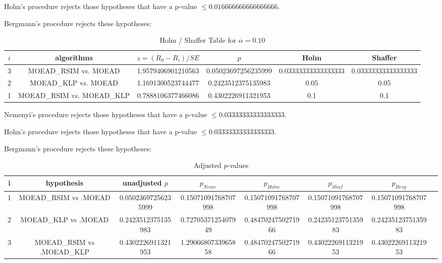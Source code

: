 \documentclass[a4paper,10pt]{article}
\begin{document}
\begin{landscape}
Holm's procedure rejects those hypotheses that have a p-value $\le0.016666666666666666$.


Bergmann's procedure rejects these hypotheses:


\begin{itemize}


\end{itemize}


\begin{table}[!htp]
\centering\tiny
\caption{Holm / Shaffer Table for $\alpha=0.10$}
\begin{tabular}{cccccc}
$i$&algorithms&$z=(R_0 - R_i)/SE$&$p$&Holm&Shaffer\\
\hline
3&MOEAD_RSIM vs. MOEAD&1.9579406901210563&0.05023697256235999&0.03333333333333333&0.03333333333333333\\
2&MOEAD_KLP vs. MOEAD&1.1691300523744477&0.2423512375135983&0.05&0.05\\
1&MOEAD_RSIM vs. MOEAD_KLP&0.7888106377466086&0.4302226911321953&0.1&0.1\\
\hline
\end{tabular}
\end{table}
Nemenyi's procedure rejects those hypotheses that have a p-value $\le0.03333333333333333$.


Holm's procedure rejects those hypotheses that have a p-value $\le0.03333333333333333$.


Bergmann's procedure rejects these hypotheses:


\begin{itemize}


\end{itemize}


\begin{table}[!htp]
\centering\tiny
\caption{Adjusted $p$-values}
\begin{tabular}{cccccccc}
i&hypothesis&unadjusted $p$&$p_{Neme}$&$p_{Holm}$&$p_{Shaf}$&$p_{Berg}$\\
\hline
1&MOEAD_RSIM vs .MOEAD&0.05023697256235999&0.15071091768707998&0.15071091768707998&0.15071091768707998&0.15071091768707998\\
2&MOEAD_KLP vs .MOEAD&0.2423512375135983&0.7270537125407949&0.4847024750271966&0.2423512375135983&0.2423512375135983\\
3&MOEAD_RSIM vs .MOEAD_KLP&0.4302226911321953&1.2906680733965858&0.4847024750271966&0.4302226911321953&0.4302226911321953\\
\hline
\end{tabular}
\end{table}

\end{landscape}
\end{document}
